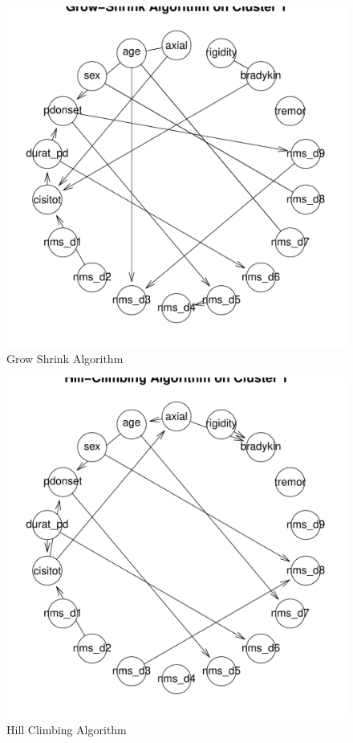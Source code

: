 \documentclass[letterpaper,12pt]{article}
\begin{document}
\begin{figure}[h]
  \centering
  \includegraphics[width=\linewidth]{clus1-bnet-gs.pdf}
  \caption{Grow Shrink Algorithm}
  \label{fig:bnet-gs}
\end{figure}

\begin{figure}[h]
  \centering
  \includegraphics[width=\linewidth]{clus1-bnet-hc.pdf}
  \caption{Hill Climbing Algorithm}
  \label{fig:bnet-hc}
\end{figure}
\end{document}
